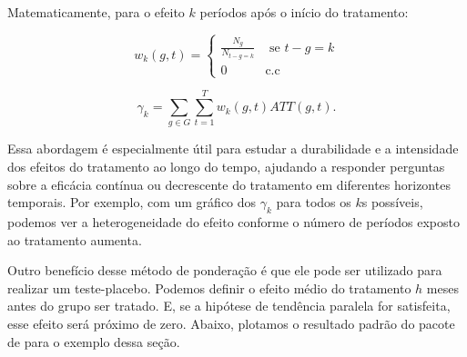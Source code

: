 \documentclass[portugues]{article}
\begin{document}
Matematicamente, para o efeito $k$ períodos após o início do tratamento:

$$ w_k(g,t) = \begin{cases} \frac{N_{g}}{N_{t-g=k}} & \text{ se } t-g=k \\ 0 & \text{c.c} \end{cases} $$

\[
\gamma_k = \sum_{g \in G} \sum_{t=1}^T   w_k(g,t) ATT(g,t).
\]

\noindent Essa abordagem é especialmente útil para estudar a durabilidade e a intensidade dos efeitos do tratamento ao longo do tempo, ajudando a responder perguntas sobre a eficácia contínua ou decrescente do tratamento em diferentes horizontes temporais. Por exemplo, com um gráfico dos $\gamma_k$ para todos os $k$s possíveis, podemos ver a heterogeneidade do efeito conforme o número de períodos exposto ao tratamento aumenta.

Outro benefício desse método de ponderação é que ele pode ser utilizado para realizar um teste-placebo. Podemos definir o efeito médio do tratamento $h$ meses antes do grupo ser tratado. E, se a hipótese de tendência paralela for satisfeita, esse efeito será próximo de zero. Abaixo, plotamos o resultado padrão do pacote de \cite{callaway2021difference} para o exemplo dessa seção.
\end{document}
